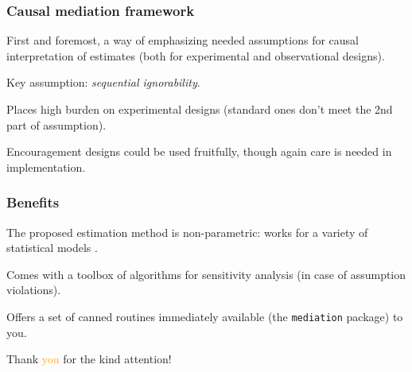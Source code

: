\documentclass[11pt,english,dvipsnames,aspectratio=169,handout]{beamer}\usepackage[]{graphicx}\usepackage[]{xcolor}
\begin{document}
\begin{frame}
	\frametitle{Causal mediation framework}
	First and foremost, a way of emphasizing needed assumptions for causal interpretation of estimates (both for experimental and observational designs).\bigskip
	\pause
	
	Key assumption: \textit{sequential ignorability}.\bigskip
	\pause
	
	Places high burden on experimental designs (standard ones don't meet the 2nd part of assumption).\bigskip
	\pause
	
	Encouragement designs could be used fruitfully, though again care is needed in implementation.
\end{frame}

\begin{frame}
	\frametitle{Benefits}
	The proposed estimation method is non-parametric: works for a variety of statistical models \cite{imai_general_2010} .\bigskip
	\pause
	
	Comes with a toolbox of algorithms for sensitivity analysis (in case of assumption violations).\bigskip
	\pause
	
	Offers a set of canned routines immediately available (the \texttt{mediation} package) to you.
	
\end{frame}

\begin{frame}
\begin{center}
    \Huge Thank \textcolor{orange}{you} for the kind attention!
\end{center}
\end{frame}


\begin{frame}

\scriptsize
\end{frame}
\end{document}
